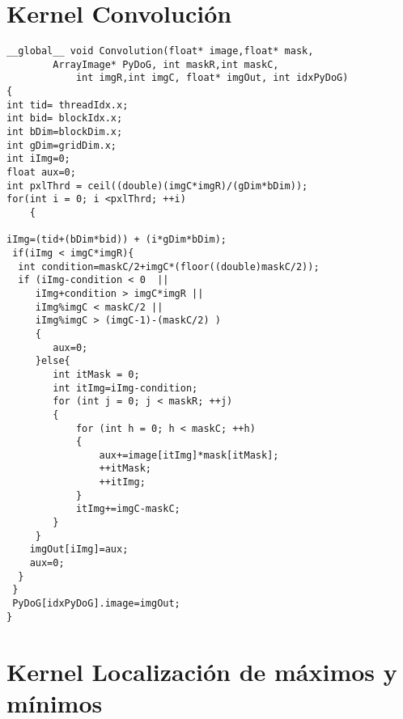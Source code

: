 \chapter{Kernel Convolución}
\begin{small}



\begin{lstlisting}
__global__ void Convolution(float* image,float* mask, 
		ArrayImage* PyDoG, int maskR,int maskC,
	        int imgR,int imgC, float* imgOut, int idxPyDoG)
{
int tid= threadIdx.x;
int bid= blockIdx.x;
int bDim=blockDim.x;
int gDim=gridDim.x;
int iImg=0;
float aux=0;
int pxlThrd = ceil((double)(imgC*imgR)/(gDim*bDim)); 
for(int i = 0; i <pxlThrd; ++i)
	{
		
iImg=(tid+(bDim*bid)) + (i*gDim*bDim); 
 if(iImg < imgC*imgR){
  int condition=maskC/2+imgC*(floor((double)maskC/2));
  if (iImg-condition < 0  ||										
	 iImg+condition > imgC*imgR ||								
	 iImg%imgC < maskC/2 ||										
	 iImg%imgC > (imgC-1)-(maskC/2) )							
	 {
	 	aux=0;
	 }else{		
		int itMask = 0;
		int itImg=iImg-condition;
		for (int j = 0; j < maskR; ++j)
		{		
			for (int h = 0; h < maskC; ++h)
			{
				aux+=image[itImg]*mask[itMask];
				++itMask;
				++itImg;
			}
			itImg+=imgC-maskC;
		}
	 }
	imgOut[iImg]=aux;
	aux=0;
  }
 }
 PyDoG[idxPyDoG].image=imgOut;
}
\end{lstlisting}

\end{small}
\pagebreak

\chapter{Kernel Localización de máximos y mínimos }

